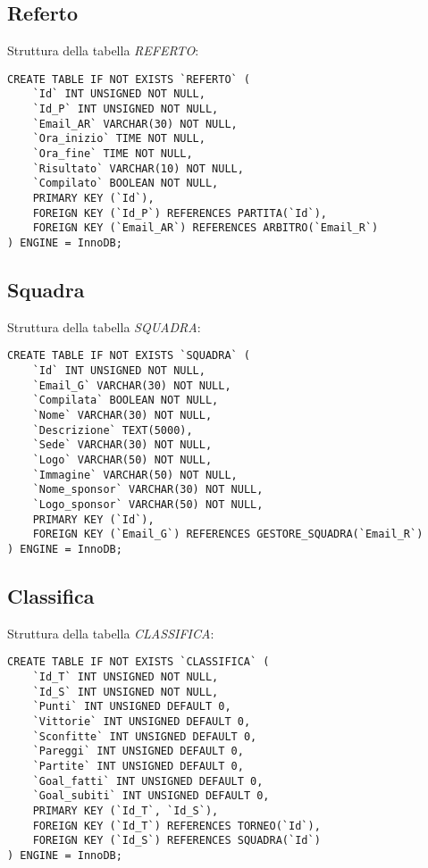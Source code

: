 \subsection{Referto}
Struttura della tabella \emph{REFERTO}:

\begin{lstlisting}
CREATE TABLE IF NOT EXISTS `REFERTO` (
	`Id` INT UNSIGNED NOT NULL,
	`Id_P` INT UNSIGNED NOT NULL,
	`Email_AR` VARCHAR(30) NOT NULL,
	`Ora_inizio` TIME NOT NULL,
	`Ora_fine` TIME NOT NULL,
	`Risultato` VARCHAR(10) NOT NULL,
	`Compilato` BOOLEAN NOT NULL,
	PRIMARY KEY (`Id`),
	FOREIGN KEY (`Id_P`) REFERENCES PARTITA(`Id`),
	FOREIGN KEY (`Email_AR`) REFERENCES ARBITRO(`Email_R`)
) ENGINE = InnoDB;
\end{lstlisting}

\subsection{Squadra}
Struttura della tabella \emph{SQUADRA}:

\begin{lstlisting}
CREATE TABLE IF NOT EXISTS `SQUADRA` (
	`Id` INT UNSIGNED NOT NULL,
	`Email_G` VARCHAR(30) NOT NULL,
	`Compilata` BOOLEAN NOT NULL,
	`Nome` VARCHAR(30) NOT NULL,
	`Descrizione` TEXT(5000),
	`Sede` VARCHAR(30) NOT NULL,
	`Logo` VARCHAR(50) NOT NULL,
	`Immagine` VARCHAR(50) NOT NULL,
	`Nome_sponsor` VARCHAR(30) NOT NULL,
	`Logo_sponsor` VARCHAR(50) NOT NULL,
	PRIMARY KEY (`Id`),
	FOREIGN KEY (`Email_G`) REFERENCES GESTORE_SQUADRA(`Email_R`)
) ENGINE = InnoDB;
\end{lstlisting}

\subsection{Classifica}
Struttura della tabella \emph{CLASSIFICA}:

\begin{lstlisting}
CREATE TABLE IF NOT EXISTS `CLASSIFICA` (
	`Id_T` INT UNSIGNED NOT NULL,
	`Id_S` INT UNSIGNED NOT NULL,
	`Punti` INT UNSIGNED DEFAULT 0,
	`Vittorie` INT UNSIGNED DEFAULT 0,
	`Sconfitte` INT UNSIGNED DEFAULT 0,
	`Pareggi` INT UNSIGNED DEFAULT 0,
	`Partite` INT UNSIGNED DEFAULT 0,
	`Goal_fatti` INT UNSIGNED DEFAULT 0,
	`Goal_subiti` INT UNSIGNED DEFAULT 0,
	PRIMARY KEY (`Id_T`, `Id_S`),
	FOREIGN KEY (`Id_T`) REFERENCES TORNEO(`Id`),
	FOREIGN KEY (`Id_S`) REFERENCES SQUADRA(`Id`)
) ENGINE = InnoDB;
\end{lstlisting}

